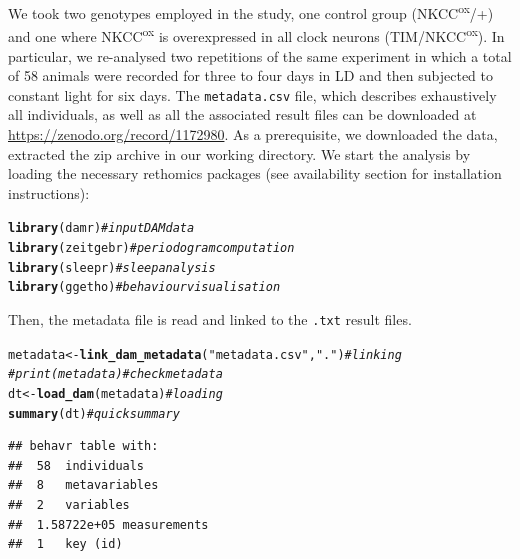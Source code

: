 \documentclass[10pt,letterpaper]{article}\usepackage[]{graphicx}\usepackage[]{color}
\makeatletter
\newcommand{\hlstr}[1]{\textcolor[rgb]{0.192,0.494,0.8}{#1}}%
\newcommand{\hlcom}[1]{\textcolor[rgb]{0.678,0.584,0.686}{\textit{#1}}}%
\newcommand{\hlstd}[1]{\textcolor[rgb]{0.345,0.345,0.345}{#1}}%
\newcommand{\hlkwb}[1]{\textcolor[rgb]{0.69,0.353,0.396}{#1}}%
\newcommand{\hlkwd}[1]{\textcolor[rgb]{0.737,0.353,0.396}{\textbf{#1}}}%
\newenvironment{kframe}{%
 \def\at@end@of@kframe{}%
 \ifinner\ifhmode%
  \def\at@end@of@kframe{\end{minipage}}%
  \begin{minipage}{\columnwidth}%
 \fi\fi%
 \def\FrameCommand##1{\hskip\@totalleftmargin \hskip-\fboxsep
 \colorbox{shadecolor}{##1}\hskip-\fboxsep
     \hskip-\linewidth \hskip-\@totalleftmargin \hskip\columnwidth}%
 \MakeFramed {\advance\hsize-\width
   \@totalleftmargin\z@ \linewidth\hsize
   \@setminipage}}%
 {\par\unskip\endMakeFramed%
 \at@end@of@kframe}
\newenvironment{knitrout}{}{} %
\makeatother
\begin{document}
We took two genotypes employed in the study, one control group (NKCC\textsuperscript{ox}/+) and one where NKCC\textsuperscript{ox} is overexpressed in all clock neurons (TIM/NKCC\textsuperscript{ox}).
In particular, we re-analysed two repetitions of the same experiment in which a total of 58 animals were recorded for three to four days in LD and then subjected to constant light for six days.
The \texttt{metadata.csv} file, which describes exhaustively all individuals, as well as all the associated result files can be downloaded at \href{https://zenodo.org/record/1172980}{https://zenodo.org/record/1172980}.
As a prerequisite, we downloaded the data, extracted the zip archive in our working directory.
We start the analysis by loading the necessary rethomics packages (see availability section for installation instructions):

\begin{knitrout}
\color{fgcolor}\begin{kframe}
\begin{alltt}
\hlkwd{library}\hlstd{(damr)}      \hlcom{# input DAM data}
\hlkwd{library}\hlstd{(zeitgebr)}  \hlcom{# periodogram computation}
\hlkwd{library}\hlstd{(sleepr)}    \hlcom{# sleep analysis}
\hlkwd{library}\hlstd{(ggetho)}    \hlcom{# behaviour visualisation}
\end{alltt}
\end{kframe}
\end{knitrout}

Then, the metadata file is read and linked to the \texttt{.txt} result files.

\begin{knitrout}
\color{fgcolor}\begin{kframe}
\begin{alltt}
\hlstd{metadata} \hlkwb{<-} \hlkwd{link_dam_metadata}\hlstd{(}\hlstr{"metadata.csv"}\hlstd{,} \hlstr{"."}\hlstd{)}   \hlcom{# linking}
\hlcom{# print(metadata)                                     # check metadata}
\hlstd{dt} \hlkwb{<-} \hlkwd{load_dam}\hlstd{(metadata)}                             \hlcom{# loading}
\hlkwd{summary}\hlstd{(dt)}                                           \hlcom{# quick summary}
\end{alltt}
\begin{verbatim}
## behavr table with:
##  58	individuals
##  8	metavariables
##  2	variables
##  1.58722e+05	measurements
##  1	key (id)
\end{verbatim}
\end{kframe}
\end{knitrout}
\end{document}
